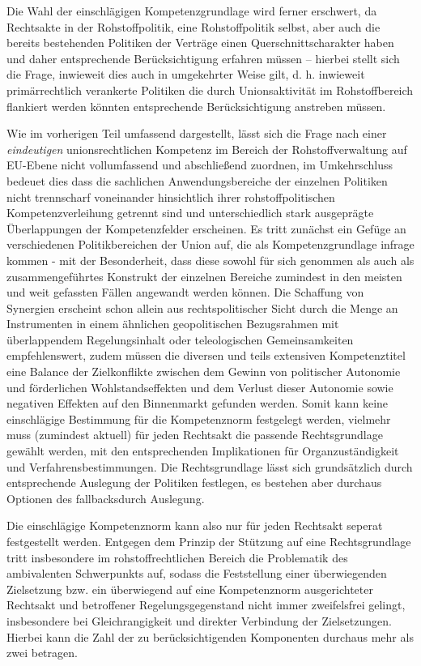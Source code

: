\documentclass[12pt,a4paper,oneside]{book} %
\begin{document}
	Die Wahl der einschlägigen Kompetenzgrundlage wird ferner erschwert, da Rechtsakte in der Rohstoffpolitik, eine Rohstoffpolitik selbst, aber auch die bereits bestehenden Politiken der Verträge einen Querschnittscharakter haben und daher entsprechende Berücksichtigung erfahren müssen -- hierbei stellt sich die Frage, inwieweit dies auch in umgekehrter Weise gilt, d. h. inwieweit primärrechtlich verankerte Politiken die durch Unionsaktivität im Rohstoffbereich flankiert werden könnten entsprechende Berücksichtigung anstreben müssen.
	
	
	Wie im vorherigen Teil umfassend dargestellt, lässt sich die Frage nach einer \textit{eindeutigen} unionsrechtlichen Kompetenz im Bereich der Rohstoffverwaltung auf EU-Ebene nicht vollumfassend und abschließend zuordnen, im Umkehrschluss bedeuet dies dass die sachlichen Anwendungsbereiche der einzelnen Politiken nicht trennscharf voneinander hinsichtlich ihrer rohstoffpolitischen Kompetenzverleihung getrennt sind und unterschiedlich stark ausgeprägte Überlappungen der Kompetenzfelder erscheinen. Es tritt zunächst ein Gefüge an verschiedenen Politikbereichen der Union auf, die als Kompetenzgrundlage infrage kommen - mit der Besonderheit, dass diese sowohl für sich genommen als auch als zusammengeführtes Konstrukt der einzelnen Bereiche zumindest in den meisten und weit gefassten Fällen angewandt werden können. Die Schaffung von Synergien erscheint schon allein aus rechtspolitischer Sicht durch die Menge an Instrumenten in einem ähnlichen geopolitischen Bezugsrahmen mit überlappendem Regelungsinhalt oder teleologischen Gemeinsamkeiten empfehlenswert, zudem müssen die diversen und teils extensiven Kompetenztitel eine Balance der Zielkonflikte zwischen dem Gewinn von politischer Autonomie und förderlichen Wohlstandseffekten und dem Verlust dieser Autonomie sowie negativen Effekten auf den Binnenmarkt gefunden werden.\autocite{Schäffer, EuZW 2023, 695, 700} Somit kann keine einschlägige Bestimmung für die Kompetenznorm festgelegt werden, vielmehr muss (zumindest aktuell) für jeden Rechtsakt die passende Rechtsgrundlage gewählt werden, mit den entsprechenden Implikationen für Organzuständigkeit und Verfahrensbestimmungen. Die Rechtsgrundlage lässt sich grundsätzlich durch entsprechende Auslegung der Politiken festlegen, es bestehen aber durchaus Optionen des \glqq fallbacks\grqq durch Auslegung. 
	
	Die einschlägige Kompetenznorm kann also nur für jeden Rechtsakt seperat festgestellt werden. Entgegen dem Prinzip der Stützung auf eine Rechtsgrundlage tritt insbesondere im rohstoffrechtlichen Bereich die Problematik des ambivalenten Schwerpunkts auf, sodass die Feststellung einer überwiegenden Zielsetzung bzw. ein überwiegend auf eine Kompetenznorm ausgerichteter Rechtsakt und betroffener Regelungsgegenstand nicht immer zweifelsfrei gelingt, insbesondere bei Gleichrangigkeit und direkter Verbindung der Zielsetzungen. Hierbei kann die Zahl der zu berücksichtigenden Komponenten durchaus mehr als zwei betragen.
	
\end{document}
